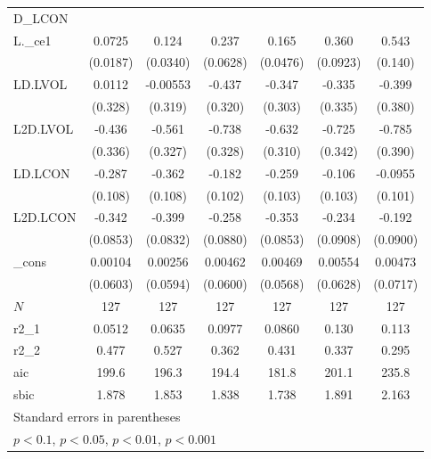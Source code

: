 {\begin{tabular}{l*{6}{c}}
\hline
D\_LCON    &                  &                  &                  &                  &                  &                  \\
L.\_ce1    &   0.0725\sym{***}&    0.124\sym{***}&    0.237\sym{***}&    0.165\sym{***}&    0.360\sym{***}&    0.543\sym{***}\\
          & (0.0187)         & (0.0340)         & (0.0628)         & (0.0476)         & (0.0923)         &  (0.140)         \\
LD.LVOL   &   0.0112         & -0.00553         &   -0.437         &   -0.347         &   -0.335         &   -0.399         \\
          &  (0.328)         &  (0.319)         &  (0.320)         &  (0.303)         &  (0.335)         &  (0.380)         \\
L2D.LVOL  &   -0.436         &   -0.561\sym{+}  &   -0.738\sym{*}  &   -0.632\sym{*}  &   -0.725\sym{*}  &   -0.785\sym{*}  \\
          &  (0.336)         &  (0.327)         &  (0.328)         &  (0.310)         &  (0.342)         &  (0.390)         \\
LD.LCON   &   -0.287\sym{**} &   -0.362\sym{***}&   -0.182\sym{+}  &   -0.259\sym{*}  &   -0.106         &  -0.0955         \\
          &  (0.108)         &  (0.108)         &  (0.102)         &  (0.103)         &  (0.103)         &  (0.101)         \\
L2D.LCON  &   -0.342\sym{***}&   -0.399\sym{***}&   -0.258\sym{**} &   -0.353\sym{***}&   -0.234\sym{*}  &   -0.192\sym{*}  \\
          & (0.0853)         & (0.0832)         & (0.0880)         & (0.0853)         & (0.0908)         & (0.0900)         \\
\_cons    &  0.00104         &  0.00256         &  0.00462         &  0.00469         &  0.00554         &  0.00473         \\
          & (0.0603)         & (0.0594)         & (0.0600)         & (0.0568)         & (0.0628)         & (0.0717)         \\
\hline
\(N\)     &      127         &      127         &      127         &      127         &      127         &      127         \\
r2\_1      &   0.0512         &   0.0635         &   0.0977         &   0.0860         &    0.130         &    0.113         \\
r2\_2      &    0.477         &    0.527         &    0.362         &    0.431         &    0.337         &    0.295         \\
aic       &    199.6         &    196.3         &    194.4         &    181.8         &    201.1         &    235.8         \\
sbic      &    1.878         &    1.853         &    1.838         &    1.738         &    1.891         &    2.163         \\
\hline\hline
\multicolumn{7}{l}{\footnotesize Standard errors in parentheses}\\
\multicolumn{7}{l}{\footnotesize \sym{+} \(p<0.1\), \sym{*} \(p<0.05\), \sym{**} \(p<0.01\), \sym{***} \(p<0.001\)}\\
\end{tabular}
}
